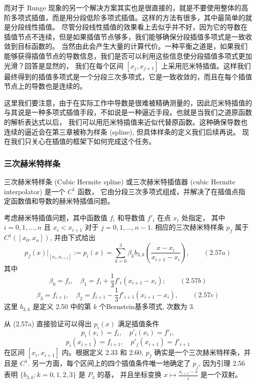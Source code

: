 \documentclass[a4paper]{ctexart}
\begin{document}
{而对于 Runge 现象的另一个解决方案其实也是很直接的，就是不要使用整体的高阶多项式插值，而是用分段低阶多项式插值。这样的方法有很多，其中最简单的就是分段线性插值。
尽管分段线性插值的效果看上去似乎并不好，因为它的导数在插值节点不连续，但是如果插值节点够多，我们能够确保分段插值多项式是一致收敛到目标函数的。
当然由此会产生大量的计算代价。一种平衡之道是，如果我们能够获得插值节点的导数信息，我们是否可以利用这些信息使分段插值多项式更加光滑？回答是显然的，
我们在每个区间 $[x_j, x_{j + 1}]$ 上采用厄米特插值。这样我们最终得到的插值多项式是一个分段三次多项式，它是一致收敛的，而且在每个插值节点上的导数也是连续的。

这里我们要注意，由于在实际工作中导数是很难被精确测量的，因此厄米特插值的与其说是一种多项式插值手段，不如说是一种逼近手段。也就是当我们之道原函数的解析表达式以后，
我们可以用厄米特插值来近似代替原函数。这种确保导数也连续的逼近会在第三章被称为样条 (spline), 但具体样条的定义我们后续再说。
现在我们只关心在插值的框架下如何完成这个任务。

\subsubsection{三次赫米特样条}

 三次赫米特样条 (Cubic Hermite spline) 或三次赫米特插值器 (cubic Hermite interpolator) 是一个 $C^1$ 函数，
它由分段三次多项式组成，并解决了在插值点指定函数值和导数的赫米特插值问题。

 考虑赫米特插值问题，其中函数值 $f_i$ 和导数值 $f'_i$ 在点 $x_i$ 处指定，
其中 $i = 0, 1, \ldots, n$ 且 $x_i < x_{i + 1}$ 对于 $j = 0, 1, \ldots, n - 1$. 相应的三次赫米特样条 $p_f$ 
属于 $C^1([x_0, x_n])$, 并由下式给出
$$
p_f(x)|_{[x_i, x_{i + 1}]} := p_i (x) = \sum_{k = 0}^{3} \beta_k b_{3, k} \left( \frac{x - x_i}{x_{i + 1} - x_i} \right), \qquad (2.57a)
$$
其中
$$
\beta_0 = f_i, \quad \beta_1 = f_i + \frac{1}{3} f'_i (x_{i + 1} - x_i); \qquad (2.57b)
$$
$$
\beta_3 = f_{i + 1}, \quad \beta_2 = f_{i + 1} - \frac{1}{3} f'_{i + 1} (x_{i + 1} - x_i), \qquad (2.57c)
$$
这里 $b_{3, k}$ 是定义 2.50 中的第 $k$ 个Bernstein基多项式, 次数为 $3$.

从 (2.57a) 直接验证可以得出 $p_i (x)$ 满足插值条件
$$
p_i (x_i) = f_i, \quad p'_i (x_i) = f'_i,
$$
$$
p_i (x_{i + 1}) = f_{i + 1}, \quad p'_j (x_{i + 1}) = f'_{i + 1}
$$
在区间 $[x_i, x_{i + 1}]$ 内。根据定义 2.33 和 2.60, $p_f$ 确实是一个三次赫米特样条，并且是 $C^1$. 
另一方面，每个区间上的四个插值条件唯一地确定了 $p_j$, 因为引理 2.56 表明 $\{b_{3,k} : k = 0, 1, 2, 3\}$ 是 $P_3$ 的基，
并且坐标变换 $x \mapsto \frac{x_{i + 1} - x}{i}$ 是一个双射。

}
\end{document}
